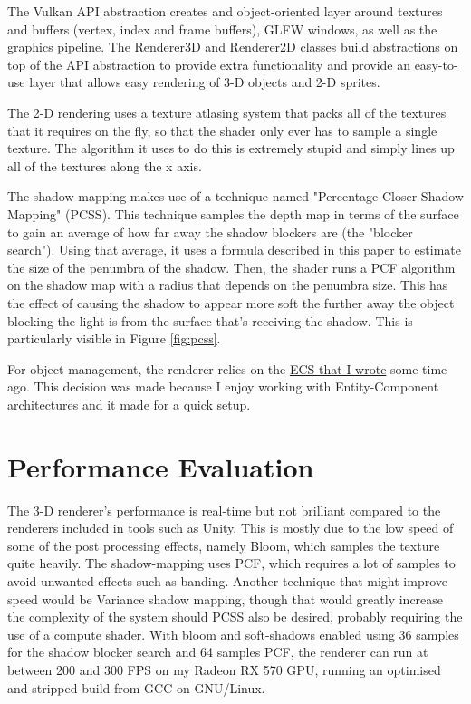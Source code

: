 \documentclass[8pt]{article}
\begin{document}
\begin{multicols}{2}
			The Vulkan API abstraction creates and object-oriented layer around
			textures and buffers (vertex, index and frame buffers), GLFW
			windows, as well as the graphics pipeline. The Renderer3D and
			Renderer2D classes build abstractions on top of the API abstraction
			to provide extra functionality and provide an easy-to-use layer
			that allows easy rendering of 3-D objects and 2-D sprites.

			The 2-D rendering uses a texture atlasing system that packs all of
			the textures that it requires on the fly, so that the shader only
			ever has to sample a single texture. The algorithm it uses to do
			this is extremely stupid and simply lines up all of the textures
			along the x axis.

			The shadow mapping makes use of a technique named
			"Percentage-Closer Shadow Mapping" (PCSS). This technique samples
			the depth map in terms of the surface to gain an average of how far
			away the shadow blockers are (the "blocker search"). Using that
			average, it uses a formula described in
			\href{https://developer.download.nvidia.com/shaderlibrary/docs/shadow_PCSS.pdf}{this
			paper} to estimate the size of the penumbra of the shadow. Then,
			the shader runs a PCF algorithm on the shadow map with a radius
			that depends on the penumbra size. This has the effect of causing
			the shadow to appear more soft the further away the object blocking
			the light is from the surface that's receiving the shadow. This is
			particularly visible in Figure \ref{fig:pcss}.

			For object management, the renderer relies on the
			\href{https://github.com/quou/ecs}{ECS that I wrote} some time ago.
			This decision was made because I enjoy working with Entity-Component
			architectures and it made for a quick setup.

			\section{Performance Evaluation}
			The 3-D renderer's performance is real-time but not brilliant
			compared to the renderers included in tools such as Unity. This is
			mostly due to the low speed of some of the post processing effects,
			namely Bloom, which samples the texture quite heavily. The
			shadow-mapping uses PCF, which requires a lot of samples to avoid
			unwanted effects such as banding. Another technique that might
			improve speed would be Variance shadow mapping, though that would
			greatly increase the complexity of the system should PCSS also be
			desired, probably requiring the use of a compute shader. With bloom
			and soft-shadows enabled using 36 samples for the shadow blocker
			search and 64 samples PCF, the renderer can run at between 200 and
			300 FPS on my Radeon RX 570 GPU, running an optimised and stripped
			build from GCC on GNU/Linux.


\end{multicols}
\end{document}
